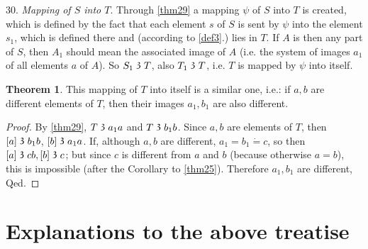 \documentclass[leqno]{article}
\theoremstyle{definition}
\newtheorem{theorem}{Theorem}
\newcommand\partof{\mathrel{\raisebox{0.45ex}{$\mathfrak{3}$}}}
\begin{document}
30. \emph{Mapping of $S$ into $T$}. Through \ref{thm29} a mapping $\psi$ of $S$ into $T$ is created, which is defined by the fact that each element $s$ of $S$ is sent by $\psi$ into the element $s_1$, which is defined there and (according to \ref{def3}.) lies in $T$. 
If $A$ is then any part of $S$, then $A_1$ should mean the associated image of $A$ (i.e. the system of images $a_1$ of all elements $a$ of $A$). So $S_1 \partof T$, also $T_1 \partof T$, i.e. $T$ is mapped by $\psi$ into itself.

\begin{theorem}\label{thm31}
This mapping of $T$ into itself is a similar one, i.e.: if $a, b$ are different elements of $T$, then their images $a_1, b_1$ are also different.
\end{theorem}

\begin{proof}
By \ref{thm29}, $T \partof a_1a$ and $T \partof b_1b$. Since $a, b$ are elements of $T$, then $[a] \partof b_1b$, $[b] \partof a_1a$. If, although $a, b$ are different, $a_1 = b_1  \dot{=} 
c$, so then $[a] \partof cb, [b] \partof c$; but since $c$ is different from $a$ and $b$ (because otherwise $a=b$), this is impossible (after the Corollary to \ref{thm25}). Therefore $a_1, b_1$ are different, Qed.
\end{proof}

\section*{Explanations to the above treatise}
\end{document}
